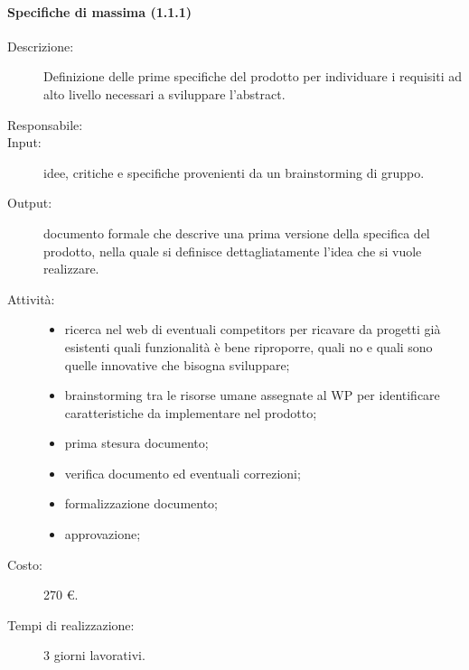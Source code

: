 \paragraph{Specifiche di massima (1.1.1)}
\begin{description}
\item[Descrizione:] Definizione delle prime specifiche del prodotto per individuare i requisiti ad alto livello necessari a sviluppare l'abstract.
\item[Responsabile:]
\item[Input:] idee, critiche e specifiche provenienti da un brainstorming di gruppo.
\item[Output:] documento formale che descrive una prima versione della specifica del prodotto, nella quale si definisce dettagliatamente l'idea che si vuole realizzare.
\item[Attivit\`{a}:]
\begin{center}
\begin{itemize}
\item ricerca nel web di eventuali competitors per ricavare da progetti gi\`{a} esistenti quali funzionalit\`{a} \`{e} bene riproporre, quali no e quali sono quelle innovative che bisogna sviluppare;
\item brainstorming tra le risorse umane assegnate al WP per identificare caratteristiche da implementare nel prodotto;
\item prima stesura documento;
\item verifica documento ed eventuali correzioni;
\item formalizzazione documento;
\item approvazione;
\end{itemize}
\end{center}
\item[Costo:] 270 \euro{}.
\item[Tempi di realizzazione:] 3 giorni lavorativi.
\end{description}

